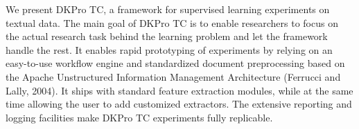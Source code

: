 We present DKPro TC, a framework for supervised learning experiments on textual data. The main goal of DKPro TC is to enable researchers to focus on the actual research task behind the learning problem and let the framework handle the rest. It enables rapid prototyping of experiments by relying on an easy-to-use workflow engine and standardized document preprocessing based on the Apache Unstructured Information Management Architecture (Ferrucci and Lally, 2004). It ships with standard feature  extraction modules, while at the same time allowing the user to add customized extractors. The extensive reporting and logging facilities make DKPro TC experiments fully replicable.
